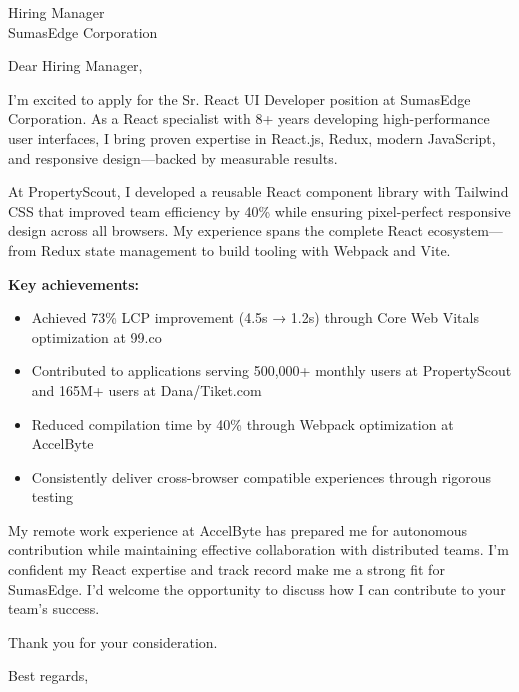 \documentclass[11pt]{letter}
\begin{document}
\begin{letter}{Hiring Manager \\ SumasEdge Corporation}

\opening{Dear Hiring Manager,}

I'm excited to apply for the Sr. React UI Developer position at SumasEdge Corporation. As a React specialist with 8+ years developing high-performance user interfaces, I bring proven expertise in React.js, Redux, modern JavaScript, and responsive design—backed by measurable results.

At PropertyScout, I developed a reusable React component library with Tailwind CSS that improved team efficiency by 40\% while ensuring pixel-perfect responsive design across all browsers. My experience spans the complete React ecosystem—from Redux state management to build tooling with Webpack and Vite.

\textbf{Key achievements:}
\begin{itemize}
    \item Achieved 73\% LCP improvement (4.5s → 1.2s) through Core Web Vitals optimization at 99.co
    \item Contributed to applications serving 500,000+ monthly users at PropertyScout and 165M+ users at Dana/Tiket.com
    \item Reduced compilation time by 40\% through Webpack optimization at AccelByte
    \item Consistently deliver cross-browser compatible experiences through rigorous testing
\end{itemize}

My remote work experience at AccelByte has prepared me for autonomous contribution while maintaining effective collaboration with distributed teams. I'm confident my React expertise and track record make me a strong fit for SumasEdge. I'd welcome the opportunity to discuss how I can contribute to your team's success.

Thank you for your consideration.

\closing{Best regards,}

\end{letter}
\end{document}
